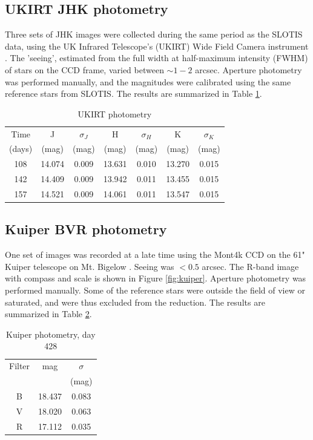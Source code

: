 \documentclass[a4paper,fleqn,usenatbib]{mnras}
\begin{document}
\subsection{UKIRT JHK photometry} \label{obs:ukirt}

Three sets of JHK images were collected during the same period as the SLOTIS data, using the UK Infrared Telescope's (UKIRT) Wide Field Camera instrument \citep[WFCAM;][]{Hod09}. The 'seeing', estimated from the full width at half-maximum intensity (FWHM) of stars on the CCD frame, varied between $\sim1-2$ arcsec. Aperture photometry was performed manually, and the magnitudes were calibrated using the same reference stars from SLOTIS. The results are summarized in Table \ref{tab:ukirt}.

\begin{table}
\caption{UKIRT photometry}
\centering
\label{tab:ukirt}
\begin{tabular}{ccccccc}
\hline
Time &J &$\sigma_J$ &H &$\sigma_H$ &K &$\sigma_K$ \\
(days) &(mag) &(mag) &(mag) &(mag) &(mag) &(mag) \\
\hline
108 &14.074 &0.009 &13.631 &0.010 &13.270 &0.015 \\
142 &14.409 &0.009 &13.942 &0.011 &13.455 &0.015 \\
157 &14.521 &0.009 &14.061 &0.011 &13.547 &0.015 \\
\hline
\end{tabular}
\end{table}

\subsection{Kuiper BVR photometry} \label{obs:kuiper}
One set of images was recorded at a late time using the Mont4k CCD on the 61" Kuiper telescope on Mt. Bigelow \citep{Fon14}. Seeing was $<0.5$ arcsec. The R-band image with compass and scale is shown in Figure \ref{fig:kuiper}. Aperture photometry was performed manually. Some of the reference stars were outside the field of view or saturated, and were thus excluded from the reduction. The results are summarized in Table \ref{tab:kuiper}.

\begin{table}
\caption{Kuiper photometry, day 428}
\centering
\label{tab:kuiper}
\begin{tabular}{@{}ccc}
\hline
Filter &mag &$\sigma$ \\ 
 & &(mag) \\
\hline
B &18.437 &0.083 \\
V &18.020 &0.063 \\
R &17.112 &0.035 \\
\hline
\end{tabular}
\end{table}
\end{document}
